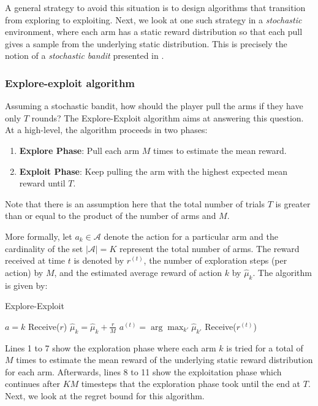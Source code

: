 \documentclass[11pt]{article}
\begin{document}
A general strategy to avoid this situation is to design algorithms that transition from exploring to exploiting.
Next, we look at one such strategy in a \textit{stochastic} environment, where each arm has a static reward
distribution so that each pull gives a sample from the underlying static distribution. This is precisely the
notion of a \textit{stochastic bandit} presented in \cite{chernoff1959sequential}.

\subsubsection{Explore-exploit algorithm}
Assuming a stochastic bandit, how should the player pull the arms if they have only $T$ rounds? The
Explore-Exploit algorithm aims at answering this question. At a high-level, the algorithm proceeds in two
phases:
\begin{enumerate}
    \item \textbf{Explore Phase}: Pull each arm $M$ times to estimate the mean reward.
    \item \textbf{Exploit Phase}: Keep pulling the arm with the highest expected mean reward until $T$.
\end{enumerate}

Note that there is an assumption here that the total number of trials $T$ is greater than or equal to the product
of the number of arms and $M$.

More formally, let $a_k \in \mathcal{A}$ denote the action for a particular arm and the cardinality of the
set $|\mathcal{A}| = K$ represent the total number of arms. The reward received at time $t$ is denoted by
$r^{(t)}$, the number of exploration steps (per action) by $M$, and the estimated average reward of action
$k$ by $\hat{\mu}_k$. The algorithm is given by:

\begin{algorithm}[H]
\caption{Explore-Exploit}
\label{algo:explore-exploit}
\begin{algorithmic}[1]
\STATE $a = k$
\STATE Receive($r$)
\STATE $\hat{\mu}_k = \hat{\mu}_k + \frac{r}{M}$
\ENDFOR
\ENDFOR
{}
\STATE $a^{(t)} = \arg \max_{k'} \hat{\mu}_{k'}$
\STATE Receive($r^{(t)}$)
\ENDFOR
\end{algorithmic}
\end{algorithm}

Lines 1 to 7 show the exploration phase where each arm $k$ is tried for a total of $M$ times to estimate the
mean reward of the underlying static reward distribution for each arm. Afterwards, lines 8 to 11 show the
exploitation phase which continues after $KM$ timesteps that the exploration phase took until the end at $T$.
Next, we look at the regret bound for this algorithm.
\end{document}
